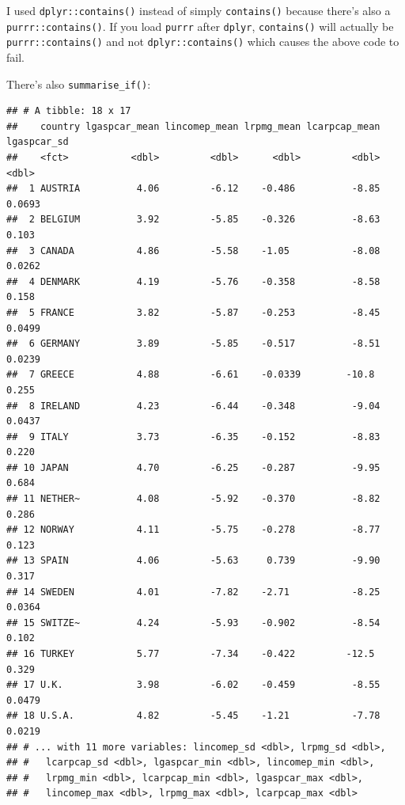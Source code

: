 \documentclass[]{gitbook}
\newenvironment{Shaded}{\begin{snugshade}}{\end{snugshade}}
\newcommand{\KeywordTok}[1]{\textcolor[rgb]{0.13,0.29,0.53}{\textbf{#1}}}
\newcommand{\NormalTok}[1]{#1}
\newcommand{\OperatorTok}[1]{\textcolor[rgb]{0.81,0.36,0.00}{\textbf{#1}}}
\newcommand{\StringTok}[1]{\textcolor[rgb]{0.31,0.60,0.02}{#1}}
\theoremstyle{definition}
\theoremstyle{definition}
\theoremstyle{definition}
\theoremstyle{remark}
\begin{document}
I used \texttt{dplyr::contains()} instead of simply \texttt{contains()}
because there's also a \texttt{purrr::contains()}. If you load
\texttt{purrr} after \texttt{dplyr}, \texttt{contains()} will actually
be \texttt{purrr::contains()} and not \texttt{dplyr::contains()} which
causes the above code to fail.

There's also \texttt{summarise\_if()}:

\begin{Shaded}
\end{Shaded}

\begin{verbatim}
## # A tibble: 18 x 17
##    country lgaspcar_mean lincomep_mean lrpmg_mean lcarpcap_mean lgaspcar_sd
##    <fct>           <dbl>         <dbl>      <dbl>         <dbl>       <dbl>
##  1 AUSTRIA          4.06         -6.12    -0.486          -8.85      0.0693
##  2 BELGIUM          3.92         -5.85    -0.326          -8.63      0.103 
##  3 CANADA           4.86         -5.58    -1.05           -8.08      0.0262
##  4 DENMARK          4.19         -5.76    -0.358          -8.58      0.158 
##  5 FRANCE           3.82         -5.87    -0.253          -8.45      0.0499
##  6 GERMANY          3.89         -5.85    -0.517          -8.51      0.0239
##  7 GREECE           4.88         -6.61    -0.0339        -10.8       0.255 
##  8 IRELAND          4.23         -6.44    -0.348          -9.04      0.0437
##  9 ITALY            3.73         -6.35    -0.152          -8.83      0.220 
## 10 JAPAN            4.70         -6.25    -0.287          -9.95      0.684 
## 11 NETHER~          4.08         -5.92    -0.370          -8.82      0.286 
## 12 NORWAY           4.11         -5.75    -0.278          -8.77      0.123 
## 13 SPAIN            4.06         -5.63     0.739          -9.90      0.317 
## 14 SWEDEN           4.01         -7.82    -2.71           -8.25      0.0364
## 15 SWITZE~          4.24         -5.93    -0.902          -8.54      0.102 
## 16 TURKEY           5.77         -7.34    -0.422         -12.5       0.329 
## 17 U.K.             3.98         -6.02    -0.459          -8.55      0.0479
## 18 U.S.A.           4.82         -5.45    -1.21           -7.78      0.0219
## # ... with 11 more variables: lincomep_sd <dbl>, lrpmg_sd <dbl>,
## #   lcarpcap_sd <dbl>, lgaspcar_min <dbl>, lincomep_min <dbl>,
## #   lrpmg_min <dbl>, lcarpcap_min <dbl>, lgaspcar_max <dbl>,
## #   lincomep_max <dbl>, lrpmg_max <dbl>, lcarpcap_max <dbl>
\end{verbatim}
\end{document}
